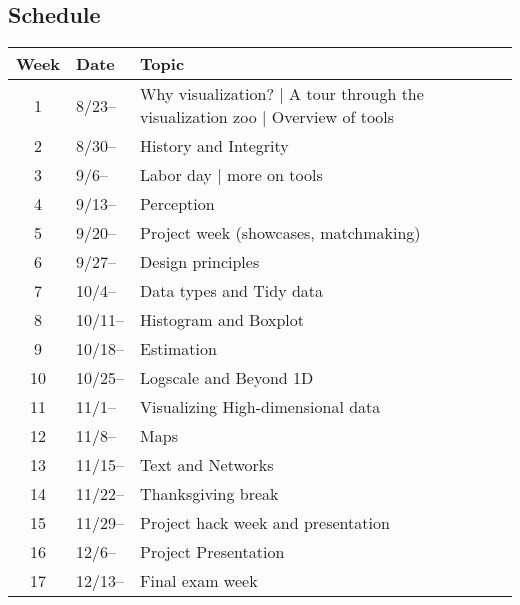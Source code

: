 \subsection{Schedule}\label{sub:schedule}%

\begin{tabular}{@{}cll@{}} \toprule
  Week & Date & Topic \\\midrule
  1 & 8/23-- & Why visualization? | A tour through the visualization zoo | Overview of tools \\
  2 & 8/30-- & History and Integrity \\
  3 & 9/6--  & Labor day | more on tools \\
  4 & 9/13--  & Perception \\
  5 & 9/20--  & Project week (showcases, matchmaking) \\
  6 & 9/27--  & Design principles \\
  7 & 10/4--  & Data types and Tidy data \\
  8 & 10/11--  & Histogram and Boxplot \\
  9 & 10/18--  & Estimation \\
  10 & 10/25--  & Logscale and Beyond 1D \\
  11 & 11/1--  & Visualizing High-dimensional data \\
  12 & 11/8--  & Maps \\
  13 & 11/15--  & Text and Networks \\
  14 & 11/22--  & Thanksgiving break \\
  15 & 11/29--  & Project hack week and presentation \\
  16 & 12/6--  & Project Presentation \\
  17 & 12/13--  & Final exam week \\
  \bottomrule
\end{tabular}

